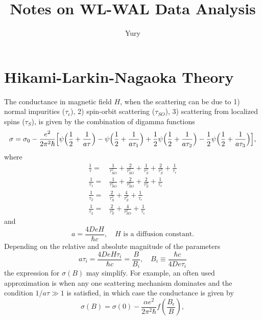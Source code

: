 \documentclass[11pt]{article} %
\title{Notes on WL-WAL Data Analysis}
\author{Yury}
\begin{document}
\maketitle

\section{Hikami-Larkin-Nagaoka Theory}
The conductance in magnetic field $H$, when the scattering can be due to 1) normal impurities ($\tau_\epsilon$), 2) spin-orbit scattering ($\tau_{SO}$), 3) scattering from localized spins ($\tau_S$), is given by the combination of digamma functions
\begin{equation}
	\sigma = \sigma_0 - \frac{e^2}{2\pi^2\hbar}\Bigl\lbrack \psi\Bigl(\frac{1}{2}+\frac{1}{a\tau}\Bigr)-\psi\Bigl(\frac{1}{2}+\frac{1}{a\tau_1}\Bigr)+\frac{1}{2}\psi\Bigl(\frac{1}{2}+\frac{1}{a\tau_2}\Bigr)-\frac{1}{2}\psi\Bigl(\frac{1}{2}+\frac{1}{a\tau_3}\Bigr)\Bigr\rbrack,
\end{equation}
where
\begin{eqnarray}
	\frac{1}{\tau} = & \displaystyle{\frac{1}{\tau^z_{SO}}+\frac{2}{\tau^x_{SO}}+\frac{1}{\tau^z_{S}}+\frac{2}{\tau^x_{S}}+\frac{1}{\tau_{\epsilon}}}\\
	\frac{1}{\tau_1} = & \displaystyle{\frac{1}{\tau^z_{SO}}+\frac{2}{\tau^x_{SO}}+\frac{2}{\tau^x_{S}}+\frac{1}{\tau_{\epsilon}}}\\
	\frac{1}{\tau_2} = & \displaystyle{\frac{2}{\tau^z_{S}}+\frac{4}{\tau^x_{S}}+\frac{1}{\tau_{\epsilon}}}\\
	\frac{1}{\tau_3} = & \displaystyle{\frac{2}{\tau^z_{S}}+\frac{4}{\tau^x_{SO}}+\frac{1}{\tau_{\epsilon}}}	
\end{eqnarray}
and
\begin{equation}
	a = \frac{4DeH}{\hbar c},\quad H \textrm{ is a diffusion constant.}
\end{equation}
Depending on the relative and absolute magnitude of the parameters
\begin{equation}
	a\tau_i = \frac{4DeH\tau_i}{\hbar c} = \frac{B}{B_i}, \quad B_i \equiv \frac{\hbar c}{4De\tau_i}
\end{equation}
the expression for $\sigma(B)$ may simplify. For example, an often used approximation is when any one scattering mechanism dominates and the condition $1/a\tau \gg 1$ is satisfied, in which case the conductance is given by
\begin{equation}
	\sigma(B) = \sigma(0) -\frac{\alpha e^2}{2\pi^2\hbar}f\left(\frac{B_\epsilon}{B}\right),
\end{equation}
\end{document}
